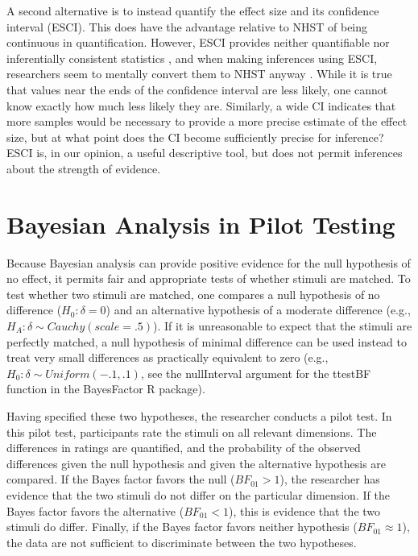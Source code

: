 \documentclass[fignum,nobf,man]{apa}
\begin{document}
A second alternative is to instead quantify the effect size and its confidence interval (ESCI). This does have the advantage relative to NHST of being continuous in quantification.  However, ESCI provides neither quantifiable nor inferentially consistent statistics \citep[see][]{Morey:etal:2014}, and when making inferences using ESCI, researchers seem to mentally convert them to NHST anyway \citep{Hoekstra:etal:2014}. While it is true that values near the ends of the confidence interval are less likely, one cannot know exactly how much less likely they are. Similarly, a wide CI indicates that more samples would be necessary to provide a more precise estimate of the effect size, but at what point does the CI become sufficiently precise for inference? ESCI is, in our opinion, a useful descriptive tool, but does not permit inferences about the strength of evidence.

\section{Bayesian Analysis in Pilot Testing}
Because Bayesian analysis can provide positive evidence for the null hypothesis of no effect, it permits fair and appropriate tests of whether stimuli are matched. To test whether two stimuli are matched, one compares a null hypothesis of no difference ($H_0: \delta{} = 0$) and an alternative hypothesis of a moderate difference (e.g., $H_A: \delta{} \sim{} Cauchy(scale = .5)$). If it is unreasonable to expect that the stimuli are perfectly matched, a null hypothesis of minimal difference can be used instead to treat very small differences as practically equivalent to zero (e.g., $H_0: \delta{} \sim{} Uniform(-.1, .1)$, see the nullInterval argument for the ttestBF function in the BayesFactor R package). 

Having specified these two hypotheses, the researcher conducts a pilot test. In this pilot test, participants rate the stimuli on all relevant dimensions.  The differences in ratings are quantified, and the probability of the observed differences given the null hypothesis and given the alternative hypothesis are compared. If the Bayes factor favors the null ($BF_{01} > 1$), the researcher has evidence that the two stimuli do not differ on the particular dimension. If the Bayes factor favors the alternative ($BF_{01} < 1$), this is evidence that the two stimuli do differ. Finally, if the Bayes factor favors neither hypothesis ($BF_{01} \approx 1$), the data are not sufficient to discriminate between the two hypotheses.
 
\end{document}
